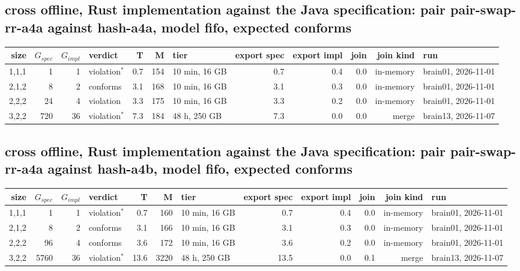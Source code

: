 \documentclass[10pt]{article}
\begin{document}
\subsection*{cross offline, Rust implementation against the Java specification: pair \textsf{pair-swap-rr-a4a} against \textsf{hash-a4a}, model fifo, expected conforms}
\begin{longtable}{@{}rrrlrrlrrrrl@{}}
\toprule
size & $G_{\mathit{spec}}$ & $G_{\mathit{impl}}$ & verdict & T & M & tier & export spec & export impl & join & join kind & run \\
\midrule
\endhead
\color{red} 1,1,1 & 1 & 1 & violation$^{\ast}$ & 0.7 & 154 & 10 min, 16 GB & 0.7 & 0.4 & 0.0 & in-memory & brain01, 2026-11-01 \\
\color{red} 2,1,2 & 8 & 2 & conforms & 3.1 & 168 & 10 min, 16 GB & 3.1 & 0.3 & 0.0 & in-memory & brain01, 2026-11-01 \\
\color{red} 2,2,2 & 24 & 4 & violation & 3.3 & 175 & 10 min, 16 GB & 3.3 & 0.2 & 0.0 & in-memory & brain01, 2026-11-01 \\
\color{red} 3,2,2 & 720 & 36 & violation$^{\ast}$ & 7.3 & 184 & 48 h, 250 GB & 7.3 & 0.0 & 0.0 & merge & brain13, 2026-11-07 \\
\bottomrule
\end{longtable}
\subsection*{cross offline, Rust implementation against the Java specification: pair \textsf{pair-swap-rr-a4a} against \textsf{hash-a4b}, model fifo, expected conforms}
\begin{longtable}{@{}rrrlrrlrrrrl@{}}
\toprule
size & $G_{\mathit{spec}}$ & $G_{\mathit{impl}}$ & verdict & T & M & tier & export spec & export impl & join & join kind & run \\
\midrule
\endhead
\color{red} 1,1,1 & 1 & 1 & violation$^{\ast}$ & 0.7 & 160 & 10 min, 16 GB & 0.7 & 0.4 & 0.0 & in-memory & brain01, 2026-11-01 \\
\color{red} 2,1,2 & 8 & 2 & conforms & 3.1 & 166 & 10 min, 16 GB & 3.1 & 0.3 & 0.0 & in-memory & brain01, 2026-11-01 \\
\color{red} 2,2,2 & 96 & 4 & conforms & 3.6 & 172 & 10 min, 16 GB & 3.6 & 0.2 & 0.0 & in-memory & brain01, 2026-11-01 \\
\color{red} 3,2,2 & 5760 & 36 & violation$^{\ast}$ & 13.6 & 3220 & 48 h, 250 GB & 13.5 & 0.0 & 0.1 & merge & brain13, 2026-11-07 \\
\bottomrule
\end{longtable}
\end{document}
